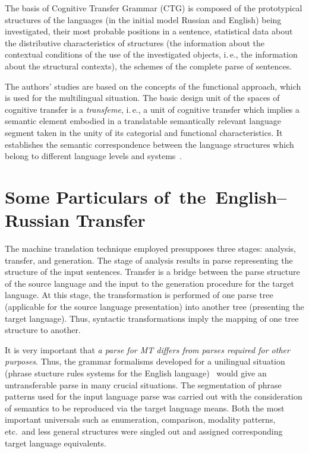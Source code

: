 \begin{multicols}{2}
     The basis of Cognitive Transfer Grammar (CTG) is composed of the 
     prototypical structures of the languages (in the initial model Russian and 
English) being investigated, their most probable positions in a sentence, statistical 
data about the distributive characteristics of structures (the information about the 
contextual conditions of the use of the investigated objects, i.\,e., the information 
about the structural contexts), the schemes of the complete parse of sentences.
     
The authors' studies are based on the concepts of the functional approach, which 
is used for the multilingual situation. The basic design unit of the spaces of 
cognitive transfer is a \textit{transfeme}, i.\,e., 
a unit of cognitive transfer which implies a 
semantic element embodied in a translatable semantically relevant language 
segment taken  in the unity of its categorial and functional characteristics. It 
establishes the semantic correspondence between the language structures which 
belong to different language levels and systems~\cite{4-koz}. 

\section{Some Particulars of~the~English--Russian Transfer}
     
     \noindent
     The machine translation technique employed presupposes three stages: 
analysis, transfer, and generation. The stage of analysis results in parse representing 
the structure of the input sentences. Transfer is a bridge between the parse structure 
of the source language and the input to the generation procedure for the target 
language. At this stage, the transformation is performed of one parse tree 
(applicable for the source language presentation) into another tree (presenting the 
target language). Thus, syntactic transformations imply the mapping of one tree 
structure to another. 
     
     It is very important that \textit{a parse for MT differs from parses required 
for other purposes}. Thus, the grammar formalisms developed for a unilingual 
situation (phrase stucture rules systems for the English language)~\cite{5-koz} 
would give an untransferable parse in many crucial situations. The segmentation of 
phrase patterns used for the input language parse was carried out with the 
consideration of semantics to be reproduced via the target language means. Both 
the most important universals such as enumeration, comparison, modality patterns, 
etc.\ and less general structures were singled out and assigned corresponding target 
language equivalents. 


\end{multicols}
